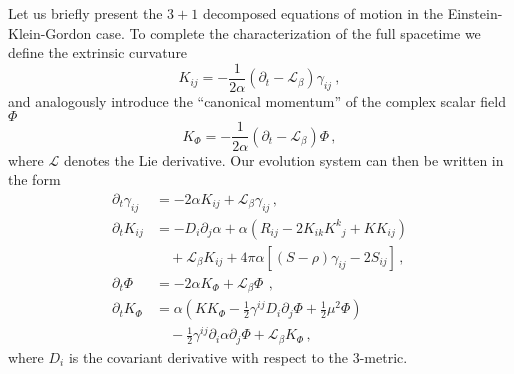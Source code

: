 Let us briefly present the $3+1$ decomposed equations of motion in the Einstein-Klein-Gordon case. To complete the characterization of the full spacetime we define the extrinsic curvature
\begin{equation}
\label{eq:KijDef}
K_{ij}  =   - \frac{1}{2\alpha} \left( \partial_{t} - \mathcal{L}_{\beta} \right) \gamma_{ij} \ ,
\end{equation}
and analogously introduce the ``canonical momentum'' of the complex scalar field $\Phi$
\begin{equation}
\label{eq:Kphi}
K_{\Phi} = -\frac{1}{2\alpha}  \left( \partial_{t} - \mathcal{L}_{\beta} \right) \Phi \,,
\end{equation}
where $\mathcal{L}$ denotes the Lie derivative.
%
Our evolution system can then be written in the form
%
%
\begin{subequations}
\begin{align}
  \partial_{t} \gamma_{ij} & = - 2 \alpha K_{ij} + \mathcal{L}_{\beta} \gamma_{ij} \,,
                       \label{eq:dtgamma} \\
%
  \partial_{t} K_{ij}      & =  - D_{i} \partial_{j} \alpha
                       + \alpha \left( R_{ij} - 2 K_{ik} K^{k}{}_{j} + K K_{ij} \right) \nonumber \\
                       & \quad + \mathcal{L}_{\beta} K_{ij} 
                       + 4\pi \alpha \left[ (S-\rho) \gamma_{ij} - 2 S_{ij} \right] \,,
                                         \label{eq:dtKij} \\
% 
  \partial_{t} \Phi & = - 2 \alpha K_\Phi + \mathcal{L}_{\beta} \Phi\
                \,, \label{eq:dtPhi} \\
%
  \partial_{t} K_\Phi &  = \alpha \left( K K_{\Phi} - \frac{1}{2} \gamma^{ij} D_i \partial_j \Phi
                  + \frac{1}{2} \mu^2 \Phi \right) \nonumber \\
                 & \quad - \frac{1}{2} \gamma^{ij} \partial_i \alpha \partial_j \Phi
                       + \mathcal{L}_{\beta} K_\Phi \,, \label{eq:dtKphi}
\end{align}
\end{subequations}
% 
where $D_i$ is the covariant derivative with respect to the $3$-metric.


